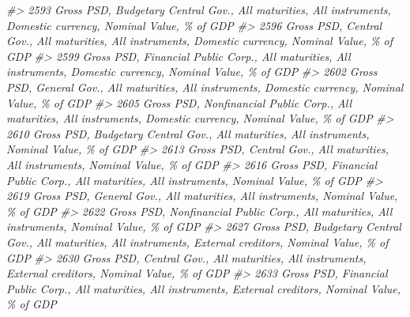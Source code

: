 \documentclass[
]{bxjsbook}
\newenvironment{Shaded}{\begin{snugshade}}{\end{snugshade}}
\newcommand{\CommentTok}[1]{\textcolor[rgb]{0.56,0.35,0.01}{\textit{#1}}}
\theoremstyle{definition}
\theoremstyle{definition}
\theoremstyle{definition}
\theoremstyle{definition}
\theoremstyle{remark}
\begin{document}
\begin{Shaded}
\begin{Highlighting}[]
\CommentTok{\#\textgreater{} 2593                                                             Gross PSD, Budgetary Central Gov., All maturities, All instruments, Domestic currency, Nominal Value, \% of GDP}
\CommentTok{\#\textgreater{} 2596                                                                       Gross PSD, Central Gov., All maturities, All instruments, Domestic currency, Nominal Value, \% of GDP}
\CommentTok{\#\textgreater{} 2599                                                             Gross PSD, Financial Public Corp., All maturities, All instruments, Domestic currency, Nominal Value, \% of GDP}
\CommentTok{\#\textgreater{} 2602                                                                       Gross PSD, General Gov., All maturities, All instruments, Domestic currency, Nominal Value, \% of GDP}
\CommentTok{\#\textgreater{} 2605                                                          Gross PSD, Nonfinancial Public Corp., All maturities, All instruments, Domestic currency, Nominal Value, \% of GDP}
\CommentTok{\#\textgreater{} 2610                                                                                Gross PSD, Budgetary Central Gov., All maturities, All instruments, Nominal Value, \% of GDP}
\CommentTok{\#\textgreater{} 2613                                                                                          Gross PSD, Central Gov., All maturities, All instruments, Nominal Value, \% of GDP}
\CommentTok{\#\textgreater{} 2616                                                                                Gross PSD, Financial Public Corp., All maturities, All instruments, Nominal Value, \% of GDP}
\CommentTok{\#\textgreater{} 2619                                                                                          Gross PSD, General Gov., All maturities, All instruments, Nominal Value, \% of GDP}
\CommentTok{\#\textgreater{} 2622                                                                             Gross PSD, Nonfinancial Public Corp., All maturities, All instruments, Nominal Value, \% of GDP}
\CommentTok{\#\textgreater{} 2627                                                            Gross PSD, Budgetary Central Gov., All maturities, All instruments, External creditors, Nominal Value, \% of GDP}
\CommentTok{\#\textgreater{} 2630                                                                      Gross PSD, Central Gov., All maturities, All instruments, External creditors, Nominal Value, \% of GDP}
\CommentTok{\#\textgreater{} 2633                                                            Gross PSD, Financial Public Corp., All maturities, All instruments, External creditors, Nominal Value, \% of GDP}

\end{Highlighting}
\end{Shaded}
\end{document}
